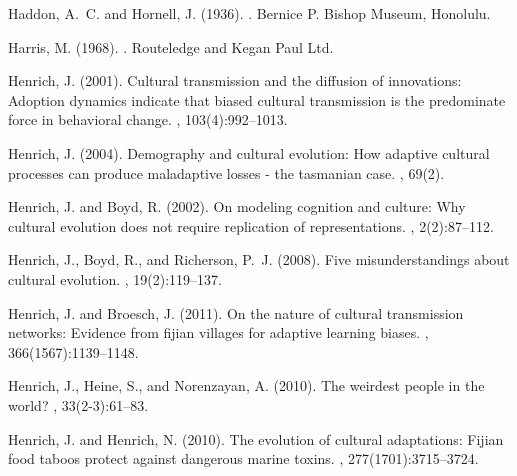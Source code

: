 Haddon, A.~C. and Hornell, J. (1936).
.
\newblock Bernice P. Bishop Museum, Honolulu.

Harris, M. (1968).
.
\newblock Routeledge and Kegan Paul Ltd.

Henrich, J. (2001).
\newblock Cultural transmission and the diffusion of innovations: Adoption
  dynamics indicate that biased cultural transmission is the predominate force
  in behavioral change.
, 103(4):992--1013.

Henrich, J. (2004).
\newblock Demography and cultural evolution: How adaptive cultural processes
  can produce maladaptive losses - the tasmanian case.
, 69(2).

Henrich, J. and Boyd, R. (2002).
\newblock On modeling cognition and culture: Why cultural evolution does not
  require replication of representations.
, 2(2):87--112.

Henrich, J., Boyd, R., and Richerson, P.~J. (2008).
\newblock Five misunderstandings about cultural evolution.
,
  19(2):119--137.

Henrich, J. and Broesch, J. (2011).
\newblock On the nature of cultural transmission networks: Evidence from fijian
  villages for adaptive learning biases.
, 366(1567):1139--1148.

Henrich, J., Heine, S., and Norenzayan, A. (2010).
\newblock The weirdest people in the world?
, 33(2-3):61--83.

Henrich, J. and Henrich, N. (2010).
\newblock The evolution of cultural adaptations: Fijian food taboos protect
  against dangerous marine toxins.
,
  277(1701):3715--3724.

